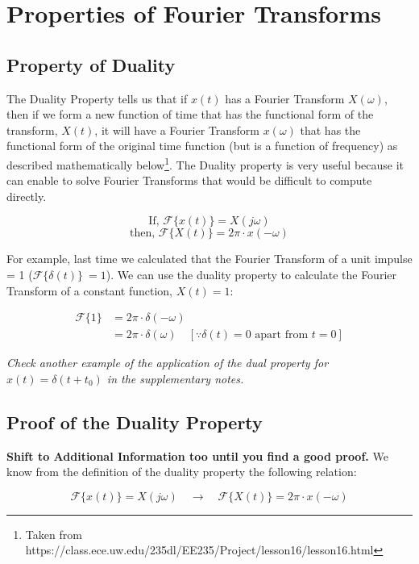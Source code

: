 \documentclass[letterpaper,12pt]{article}
\begin{document}
\newpage
\section{Properties of Fourier Transforms}
\subsection{Property of Duality}

The Duality Property tells us that if $x(t)$ has a Fourier Transform
$X(\omega)$, then if we form a new function of time that has the functional
form of the transform, $X(t)$, it will have a Fourier Transform $x(\omega)$
that has the functional form of the original time function (but is a function
of frequency) as described mathematically below\footnote{Taken from
    https://class.ece.uw.edu/235dl/EE235/Project/lesson16/lesson16.html}. The
Duality property is very useful because it can enable to solve Fourier
Transforms that would be difficult to compute directly.

\[ \text{If, } \mathcal{F}\{x(t)\} = X(j\omega)\]
\[ \text{then, } \mathcal{F}\{X(t)\} = 2\pi\cdot x(-\omega)\]

For example, last time we calculated that the Fourier Transform of a unit
impulse = 1 ($\mathcal{F}\{\delta(t)\}\ = 1$). We can use the duality property
to calculate the Fourier Transform of a constant function, $X(t) = 1$:

\begin{equation*}
    \begin{aligned}
        \mathcal{F}\{1\} & = 2\pi\cdot\delta(-\omega)                                                         \\
                         & = 2\pi\cdot\delta(\omega) \quad [\text{$\because \delta(t) = 0$ apart from $t=0$}]
    \end{aligned}
\end{equation*}

\textit{Check another example of the application of the dual property for $x(t) = \delta(t + t_{0})$ in the supplementary notes.}

\subsection{Proof of the Duality Property}
\textbf{Shift to Additional Information too until you find a good proof.}
We know from the definition of the duality property the following relation:

\[\mathcal{F}\{x(t)\} = X(j\omega) \quad \rightarrow \quad \mathcal{F}\{X(t)\} = 2\pi\cdot x(-\omega)\]
\end{document}
